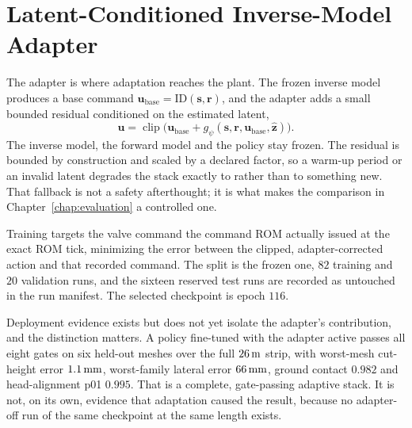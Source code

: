 \section{Latent-Conditioned Inverse-Model Adapter}
\label{sec:models:adapter}
The adapter is where adaptation reaches the plant. The frozen inverse model
produces a base command $\bm{u}_{\mathrm{base}} = \mathrm{ID}(\bm{s},\bm{r})$,
and the adapter adds a small bounded residual conditioned on the estimated
latent,
%
\begin{equation}
  \label{eq:models:adapter}
  \bm{u} = \operatorname{clip}\bigl(
    \bm{u}_{\mathrm{base}} + g_\psi(\bm{s}, \bm{r}, \bm{u}_{\mathrm{base}},
    \hat{\bm{z}})\bigr).
\end{equation}
%
The inverse model, the forward model and the policy stay frozen. The residual
is bounded by construction and scaled by a declared factor, so a warm-up
period or an invalid latent degrades the stack exactly to \ppoIDFD{} rather
than to something new. That fallback is not a safety afterthought; it is what
makes the comparison in Chapter~\ref{chap:evaluation} a controlled one.

Training targets the valve command the command ROM actually issued at the
exact ROM tick, minimizing the error between the clipped, adapter-corrected
action and that recorded command. The split is the frozen one, $82$ training
and $20$ validation runs, and the sixteen reserved test runs are recorded as
untouched in the run manifest. The selected checkpoint is epoch $116$.

Deployment evidence exists but does not yet isolate the adapter's
contribution, and the distinction matters. A policy fine-tuned with the
adapter active passes all eight gates on six held-out meshes over the full
$\unit[26]{m}$ strip, with worst-mesh cut-height error $\unit[1.1]{mm}$,
worst-family lateral error $\unit[66]{mm}$, ground contact $0.982$ and
head-alignment p01 $0.995$. That is a complete, gate-passing adaptive stack.
It is not, on its own, evidence that adaptation caused the result, because no
adapter-off run of the same checkpoint at the same length exists.

